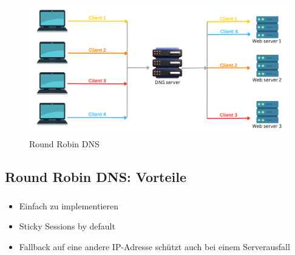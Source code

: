 \begin{frame}
    \frametitle{\insertsection}
    \framesubtitle{\insertsubsection}

	\vspace*{-12pt}
    \begin{figure}[h]
        \centering
        \captionsetup{aboveskip=0pt}
        \includegraphics[width=.7\textwidth]{../images/roundrobindns}
        \caption{Round Robin DNS~\cite{cloudns-roundrobin}}
    \end{figure}
\end{frame}

\subsection{Round Robin DNS: Vorteile}
\begin{frame}
    \frametitle{\insertsection}
    \framesubtitle{\insertsubsection}

    \begin{itemize}
    	\item Einfach zu implementieren
    	\item Sticky Sessions by default
    	\item Fallback auf eine andere IP-Adresse schützt auch bei einem Serverausfall
    \end{itemize}
\end{frame}

